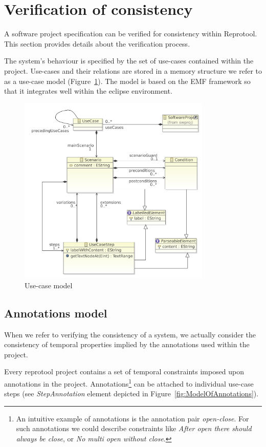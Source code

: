 \section{Verification of consistency}

A software project specification can be verified for consistency within Reprotool.
This section provides details about the verification process.

The system's behaviour is specified by the set of use-cases contained within the project.
Use-cases and their relations are stored in a memory structure we refer to as a use-case model (Figure~\ref{fig:ReprotoolUCModel}).
The model is based on the EMF framework so that it integrates well within the eclipse environment.

\begin{figure}[ht]
  \centering
  \includegraphics[width=260pt]{images/ReprotoolUCModel}
  \caption{Use-case model}
  \label{fig:ReprotoolUCModel}
\end{figure}

\subsection{Annotations model}

When we refer to verifying the consistency of a system, we actually consider the consistency of temporal properties implied by the annotations used within the project.

Every reprotool project contains a set of temporal constraints imposed upon annotations in the project.
Annotations\footnote{An intuitive example of annotations is the annotation pair \emph{open-close}. For such annotations we could describe constraints like \emph{After open there should always be close}, or \emph{No multi open without close}.} can be attached to individual use-case steps (see \emph{StepAnnotation} element depicted in Figure~\ref{fig:ModelOfAnnotations}).


